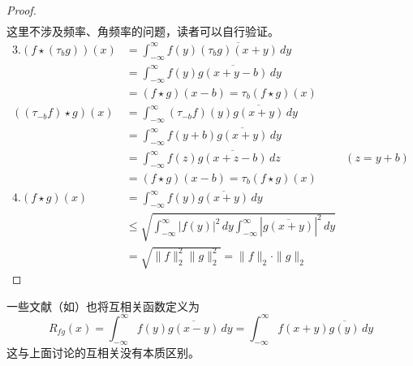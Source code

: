 \documentclass{ctexbook}
\begin{document}
\begin{proof}
\begin{align*}
\end{align*}这里不涉及频率、角频率的问题，读者可以自行验证。
\begin{align*}
    3.\left(f\star (\tau_b g)\right)(x)  & =\int_{-\infty}^{\infty}f(y)\overline{(\tau_b g)(x+y)}\,dy                                                  \\
                              & =\int_{-\infty}^{\infty}f(y)\overline{g(x+y-b)}\,dy                                                         \\
                              & =(f\star g)(x-b)=\tau_{b} (f\star g)(x)                                                                     \\
    ( (\tau_{-b}f)\star g)(x) & =\int_{-\infty}^{\infty}(\tau_{-b}f)(y)\overline{g(x+y)}\,dy                                                \\
                              & =\int_{-\infty}^{\infty}f(y+b)\overline{g(x+y)}\,dy                                                         \\
                              & =\int_{-\infty}^{\infty}f(z)\overline{g(x+z-b)}\,dz                                               & (z=y+b) \\
                              & =(f\star g)(x-b)=\tau_{b} (f\star g)(x)                                                                     \\
    4. (f\star g)(x)          & =\int_{-\infty}^{\infty}f(y)\overline{g(x+y)}\,dy                                                           \\
                              & \leq \sqrt{\int_{-\infty}^{\infty}|f(y)|^2\,dy\int_{-\infty}^{\infty}\left|\overline{g(x+y)}\right|^2\,dy  }           \\
                              & =\sqrt{\|f\|_2^2\|g\|_2^2}=\|f\|_2\cdot\|g\|_2                                              
\end{align*}
\end{proof}

一些文献（如\cite{signal_systems}）也将互相关函数定义为
$$R_{fg}(x)=\int_{-\infty}^{\infty}f(y)\overline{g(x-y)}\,dy=\int_{-\infty}^{\infty}f(x+y)\overline{g(y)}\,dy$$
这与上面讨论的互相关没有本质区别。
\end{document}
